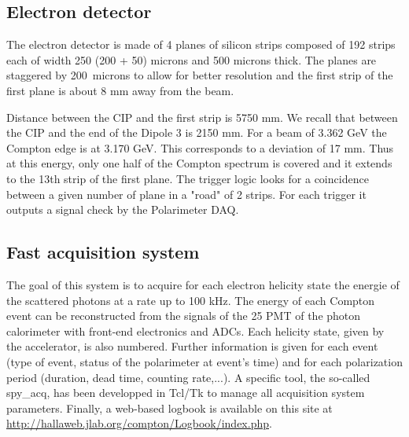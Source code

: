 {{\subsection{Electron detector}
\label{sec:compton_edet}

The electron detector is made of 4 planes of silicon strips composed
of 192 strips each of width 250 (200 + 50) microns and 500 microns
thick. The planes are staggered by 200~microns to allow for better
resolution and the first strip of the first plane is about 8 mm away from the
beam. 

Distance between the CIP and the first strip is 5750 mm. We recall that
between the CIP and the end of the Dipole 3 is 2150 mm.
For a beam of 3.362 GeV the Compton
edge is at 3.170 GeV. This corresponds to a deviation of 17 mm. Thus at
this energy, only one half of the Compton spectrum is covered and it extends
to the 13th strip of the first plane.
The trigger logic looks for a coincidence
between a given number of plane in a "road" of 2 strips. For each trigger
it outputs a signal check by the Polarimeter DAQ.

\subsection{Fast acquisition system}
\label{sec:compton_daq}
The goal of this system is to acquire
for each electron helicity state the energie of the scattered photons at a
rate up to 100 kHz. The energy of each Compton event can be
reconstructed from the signals of the 25 PMT of the photon calorimeter
with front-end electronics and ADCs. Each helicity state, given
by the accelerator, is also numbered.
Further information is given for each
event (type of event, status of the polarimeter at event's time) and for
each polarization period (duration, dead time, counting rate,...).
A specific tool, the so-called spy\_acq, has been developped in Tcl/Tk
to manage all acquisition system parameters. Finally, a web-based logbook
is available on this site at \url{http://hallaweb.jlab.org/compton/Logbook/index.php}.

}}
